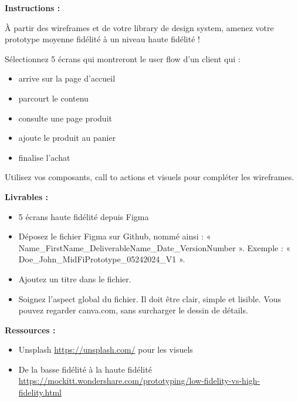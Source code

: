 \makeheaderfiles

\textbf{Instructions :}

À partir des wireframes et de votre library de design system, amenez votre prototype moyenne fidélité à un niveau haute fidélité !

Sélectionnez 5 écrans qui montreront le user flow d'un client qui :

\begin{itemize}
\item arrive sur la page d'accueil
\item parcourt le contenu
\item consulte une page produit
\item ajoute le produit au panier
\item finalise l'achat
\end{itemize}

Utilisez vos composants, call to actions et visuels pour compléter les wireframes.

\textbf{Livrables :}

\begin{itemize}
\item 5 écrans haute fidélité depuis Figma
\item Déposez le fichier Figma sur Github, nommé ainsi : « Name\_FirstName\_DeliverableName\_Date\_VersionNumber ». Exemple : « Doe\_John\_MidFiPrototype\_05242024\_V1 ».
\item Ajoutez un titre dans le fichier.
\item Soignez l'aspect global du fichier. Il doit être clair, simple et lisible. Vous pouvez regarder canva.com, sans surcharger le dessin de détails.
\end{itemize}

\textbf{Ressources :}

\begin{itemize}
\item Unsplash \url{https://unsplash.com/} pour les visuels
\item De la basse fidélité à la haute fidélité \url{https://mockitt.wondershare.com/prototyping/low-fidelity-vs-high-fidelity.html}
\end{itemize}

